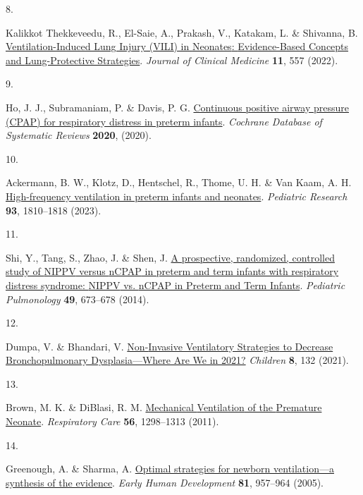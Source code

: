 \documentclass[
  letterpaper,
  DIV=11,
  numbers=noendperiod]{scrartcl}
\newlength{\cslhangindent}
\newlength{\csllabelwidth}
\newenvironment{CSLReferences}[2] %
 {\begin{list}{}{%
  \setlength{\itemindent}{0pt}
  \setlength{\leftmargin}{0pt}
  \setlength{\parsep}{0pt}
  \ifodd #1
   \setlength{\leftmargin}{\cslhangindent}
   \setlength{\itemindent}{-1\cslhangindent}
  \fi
  \setlength{\itemsep}{#2\baselineskip}}}
 {\end{list}}
\newcommand{\CSLLeftMargin}[1]{\parbox[t]{\csllabelwidth}{\strut#1\strut}}
\newcommand{\CSLRightInline}[1]{\parbox[t]{\linewidth - \csllabelwidth}{\strut#1\strut}}
\begin{document}
\begin{CSLReferences}{0}{0}
\CSLLeftMargin{8. }%
\CSLRightInline{Kalikkot Thekkeveedu, R., El-Saie, A., Prakash, V.,
Katakam, L. \& Shivanna, B.
\href{https://doi.org/10.3390/jcm11030557}{Ventilation-{Induced Lung
Injury} ({VILI}) in {Neonates}: {Evidence-Based Concepts} and
{Lung-Protective Strategies}}. \emph{Journal of Clinical Medicine}
\textbf{11}, 557 (2022).}

\CSLLeftMargin{9. }%
\CSLRightInline{Ho, J. J., Subramaniam, P. \& Davis, P. G.
\href{https://doi.org/10.1002/14651858.CD002271.pub3}{Continuous
positive airway pressure ({CPAP}) for respiratory distress in preterm
infants}. \emph{Cochrane Database of Systematic Reviews} \textbf{2020},
(2020).}

\CSLLeftMargin{10. }%
\CSLRightInline{Ackermann, B. W., Klotz, D., Hentschel, R., Thome, U. H.
\& Van Kaam, A. H.
\href{https://doi.org/10.1038/s41390-021-01639-8}{High-frequency
ventilation in preterm infants and neonates}. \emph{Pediatric Research}
\textbf{93}, 1810--1818 (2023).}

\CSLLeftMargin{11. }%
\CSLRightInline{Shi, Y., Tang, S., Zhao, J. \& Shen, J.
\href{https://doi.org/10.1002/ppul.22883}{A prospective, randomized,
controlled study of {NIPPV} versus {nCPAP} in preterm and term infants
with respiratory distress syndrome: {NIPPV} vs. {nCPAP} in {Preterm} and
{Term Infants}}. \emph{Pediatric Pulmonology} \textbf{49}, 673--678
(2014).}

\CSLLeftMargin{12. }%
\CSLRightInline{Dumpa, V. \& Bhandari, V.
\href{https://doi.org/10.3390/children8020132}{Non-{Invasive Ventilatory
Strategies} to {Decrease Bronchopulmonary Dysplasia}---{Where Are We} in
2021?} \emph{Children} \textbf{8}, 132 (2021).}

\CSLLeftMargin{13. }%
\CSLRightInline{Brown, M. K. \& DiBlasi, R. M.
\href{https://doi.org/10.4187/respcare.01429}{Mechanical {Ventilation}
of the {Premature Neonate}}. \emph{Respiratory Care} \textbf{56},
1298--1313 (2011).}

\CSLLeftMargin{14. }%
\CSLRightInline{Greenough, A. \& Sharma, A.
\href{https://doi.org/10.1016/j.earlhumdev.2005.10.002}{Optimal
strategies for newborn ventilation---a synthesis of the evidence}.
\emph{Early Human Development} \textbf{81}, 957--964 (2005).}


\end{CSLReferences}
\end{document}

